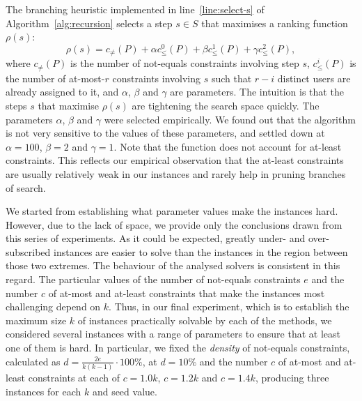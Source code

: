 \documentclass[runningheads,proof]{llncs}
\begin{document}
The branching heuristic implemented in line~\ref{line:select-s} of Algorithm~\ref{alg:recursion} selects a step $s \in S$ that maximises a ranking function $\rho(s)$:
\begin{equation}
\label{eq:rho}
\rho(s) = c_{\neq}(P) + \alpha c^0_\leq(P) + \beta c^1_\leq(P) + \gamma c^2_\leq(P),
\end{equation}
where $c_{\neq}(P)$ is the number of not-equals constraints involving step $s$, $c^i_\leq(P)$ is the number of at-most-$r$ constraints involving $s$ such that $r - i$ distinct users are already assigned to it, and $\alpha$, $\beta$ and $\gamma$ are parameters.  The intuition is that the steps $s$ that maximise $\rho(s)$ are tightening the search space quickly.  The parameters $\alpha$, $\beta$ and $\gamma$ were selected empirically.  We found out that the algorithm is not very sensitive to the values of these parameters, and settled down at $\alpha = 100$, $\beta = 2$ and $\gamma = 1$.  Note that the function does not account for at-least constraints.  This reflects our empirical observation that the at-least constraints are usually relatively weak in our instances and rarely help in pruning branches of search.




\bigskip

We started from establishing what parameter values make the instances hard.  
However, due to the lack of space, we provide only the conclusions drawn from this series of experiments.
As it could be expected, greatly under- and over-subscribed instances are easier to solve than the instances in the region between those two extremes.
The behaviour of the analysed solvers is consistent in this regard.
The particular values of the number of not-equals constraints $e$ and the number $c$ of at-most and at-least constraints that make the instances most challenging depend on $k$.
Thus, in our final experiment, which is to establish the maximum size $k$ of instances practically solvable by each of the methods, we considered several instances with a range of parameters to ensure that at least one of them is hard.
In particular, we fixed the \emph{density} of not-equals constraints, calculated as $d = \frac{2e}{k (k - 1)} \cdot 100\%$, at $d = 10\%$ and the number $c$ of at-most and at-least constraints at each of $c = 1.0k$, $c = 1.2k$ and $c = 1.4k$, producing three instances for each $k$ and seed value.
\end{document}
